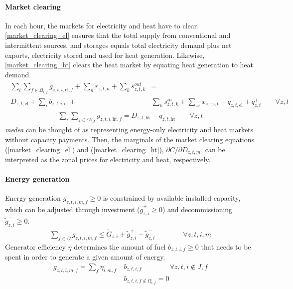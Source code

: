 \documentclass[review, 3p, times, 12pt, authoryear]{elsarticle}
\begin{document}
    \paragraph{Market clearing}
    In each hour, the markets for electricity and heat have to clear.
    \autoref{market_clearing_el} ensures that the total supply from conventional and intermittent sources, and
    storages equals total electricity demand plus net exports, electricity stored and used for heat generation.
    Likewise, \autoref{market_clearing_ht} clears the heat market by equating heat generation to heat demand.
    \begin{align}
        \begin{split}
            \sum_{i}\sum_{f \in \Omega_{i,f}} g_{z,t,i,\text{el},f} + \sum_{n} r_{z,t,n} + \sum_{k} s^{out}_{z,t,k} &= \\D_{z,t,\text{el}} + \sum_{i} b_{z,t,i,\text{el}} + & \sum_{k} s^{in}_{z,t,k} + \sum_{zz} x_{z,zz,t} - q^{-}_{z,t,\text{el}} + q^{+}_{z,t} \qquad \forall z,t
        \end{split}
        \label{market_clearing_el}
    \end{align}
    \begin{align}
        \sum_{i}\sum_{f \in \Omega_{i,f}} g_{z,t,i,\text{ht},f} = D_{z,t,\text{ht}} - q^{-}_{z,t,\text{ht}}\qquad \forall z,t\label{market_clearing_ht}
    \end{align}
    \emph{medea} can be thought of as representing energy-only electricity and heat markets without capacity payments.
    Then, the marginals of the market clearing equations (\ref{market_clearing_el}) and (\ref{market_clearing_ht}),
    $\partial C / \partial D_{z,t,m}$, can be interpreted as the zonal prices for electricity and heat, respectively.

    \paragraph{Energy generation}
    Energy generation $g_{z,t,i,m,f} \geq 0$ is constrained by available installed capacity, which can be adjusted
    through investment ($\widetilde{g}^{+}_{z,i} \geq 0$) and decommissioning $\widetilde{g}^{-}_{z,i} \geq 0$.
    \begin{align}
        \sum_{f \in  \Omega} g_{z,t,i,m,f}\leq \widetilde{G}_{z,i} +\widetilde{g}^{+}_{z,i} -\widetilde{g}^{-}_{z,i}\qquad \qquad \forall z,t,i,m
    \end{align}
    Generator efficiency $\eta$ determines the amount of fuel $b_{z,t,i,f} \geq 0$ that needs to be spent in order to generate a given amount of energy.
    \begin{align}
        g_{z,t,i,m,f} = \sum_{f}\eta_{i,m,f}\:&b_{z,t,i,f}\qquad \qquad \forall z,t,i \notin J, f \\
        &b_{z,t,i,f \notin \Omega_{i,f}} = 0
    \end{align}
\end{document}
